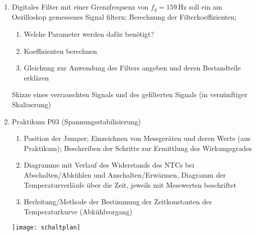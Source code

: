 \documentclass[a4paper, 12pt]{article}
\begin{document}
\begin{enumerate}
  \item Digitales Filter mit einer Grenzfrequenz von $f_g = 159 \, \si{\hertz}$
    soll ein am Oszilloskop gemessenes Signal filtern; Berechnung der
    Filterkoeffizienten;
    \begin{enumerate}[label=(\alph*)]
      \item Welche Parameter werden dafür benötigt?
      \item Koeffizienten berechnen
      \item Gleichung zur Anwendung des Filters angeben und deren Bestandteile erklären
    \end{enumerate}
    Skizze eines verrauschten Signals und des gefilterten Signals (in vernünftiger Skaliuerung)
  \item Praktikum P03 (Spannungsstabilisierung)

    \begin{enumerate}[label=(\alph*)]
      \item Position der Jumper;
      Einzeichnen von Messgeräten und deren Werte (aus Praktikum); Beschreiben der Schritte zur
      Ermittlung des Wirkungsgrades 
      \item Diagramme mit Verlauf des Widerstands des NTCs bei
      Abschalten/Abkühlen und Anschalten/Erwärmen, Diagramm der
      Temperaturverläufe über die Zeit, jeweils mit Messwerten beschriftet
      \item Herleitung/Methode der Bestimmung der Zeitkonstanten der Temperaturkurve (Abkühlvorgang)
      \end{enumerate}

      \begin{center}
      \vspace{-10ex}
       \texttt{[image: schaltplan]} 
       \end{center}


\end{enumerate}
\end{document}
